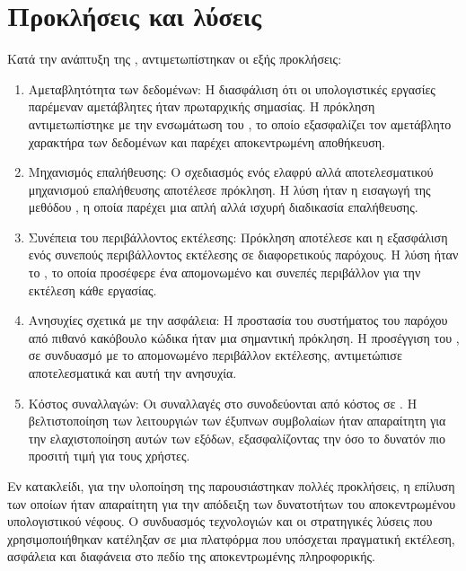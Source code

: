 \section{Προκλήσεις και λύσεις}
Κατά την ανάπτυξη της , αντιμετωπίστηκαν οι εξής προκλήσεις:
\begin{enumerate}
    \item Αμεταβλητότητα των δεδομένων: Η διασφάλιση ότι οι υπολογιστικές εργασίες παρέμεναν αμετάβλητες ήταν πρωταρχικής σημασίας. Η πρόκληση αντιμετωπίστηκε με την ενσωμάτωση του , το οποίο εξασφαλίζει τον αμετάβλητο χαρακτήρα των δεδομένων και παρέχει αποκεντρωμένη αποθήκευση.
    \item Μηχανισμός επαλήθευσης: Ο σχεδιασμός ενός ελαφρύ αλλά αποτελεσματικού μηχανισμού επαλήθευσης αποτέλεσε πρόκληση. Η λύση ήταν η εισαγωγή της μεθόδου , η οποία παρέχει μια απλή αλλά ισχυρή διαδικασία επαλήθευσης.
    \item Συνέπεια του περιβάλλοντος εκτέλεσης: Πρόκληση αποτέλεσε και η εξασφάλιση ενός συνεπούς περιβάλλοντος εκτέλεσης σε διαφορετικούς παρόχους. Η λύση ήταν το , το οποία προσέφερε ένα απομονωμένο και συνεπές περιβάλλον για την εκτέλεση κάθε εργασίας.
    \item Ανησυχίες σχετικά με την ασφάλεια: Η προστασία του συστήματος του παρόχου από πιθανό κακόβουλο κώδικα ήταν μια σημαντική πρόκληση. Η προσέγγιση του , σε συνδυασμό με το απομονωμένο περιβάλλον εκτέλεσης, αντιμετώπισε αποτελεσματικά και αυτή την ανησυχία.
    \item Κόστος συναλλαγών: Οι συναλλαγές στο  συνοδεύονται από κόστος σε . Η βελτιστοποίηση των λειτουργιών των έξυπνων συμβολαίων ήταν απαραίτητη για την ελαχιστοποίηση αυτών των εξόδων, εξασφαλίζοντας την όσο το δυνατόν πιο προσιτή τιμή για τους χρήστες.
\end{enumerate}

Εν κατακλείδι, για την υλοποίηση της  παρουσιάστηκαν πολλές προκλήσεις, η επίλυση των οποίων ήταν απαραίτητη για την απόδειξη των δυνατοτήτων του αποκεντρωμένου υπολογιστικού νέφους. Ο συνδυασμός τεχνολογιών και οι στρατηγικές λύσεις που χρησιμοποιήθηκαν κατέληξαν σε μια πλατφόρμα που υπόσχεται πραγματική εκτέλεση, ασφάλεια και διαφάνεια στο πεδίο της αποκεντρωμένης πληροφορικής.